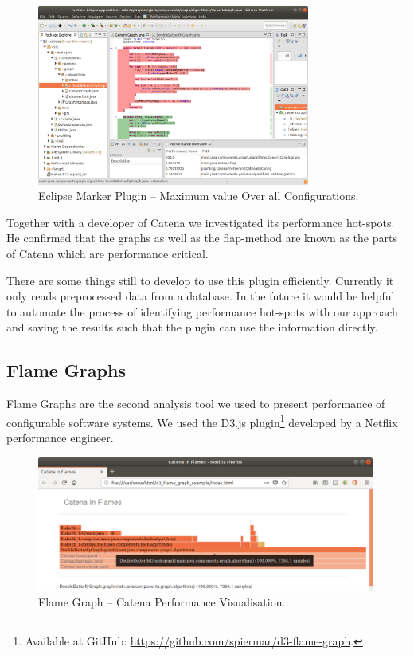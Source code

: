 \begin{figure}[h]
  \centering
  \includegraphics[width=0.8\textwidth]{images/eclipse1}
  \caption{Eclipse Marker Plugin -- Maximum value Over all Configurations.}
  \label{plugin_1}
\end{figure}


Together with a developer of Catena we investigated its performance hot-spots. He confirmed that the graphs as well as the flap-method are known as the parts of Catena which are performance critical. 

There are some things still to develop to use this plugin efficiently. Currently it only reads preprocessed data from a database. In the future it would be helpful to automate the process of identifying performance hot-spots with our approach and saving the results such that the plugin can use the information directly.



\subsection{Flame Graphs}
\label{flame_graph}

Flame Graphs are the second analysis tool we used to present performance of configurable software systems. We used the D3.js plugin\footnote{Available at GitHub: \url{https://github.com/spiermar/d3-flame-graph}.} developed by a Netflix performance engineer. 

\begin{figure}[h]
  \centering
  \includegraphics[width=0.99\textwidth]{images/flame_1}
  \caption{Flame Graph -- Catena Performance Visualisation.}
  \label{flame_1}
\end{figure}


